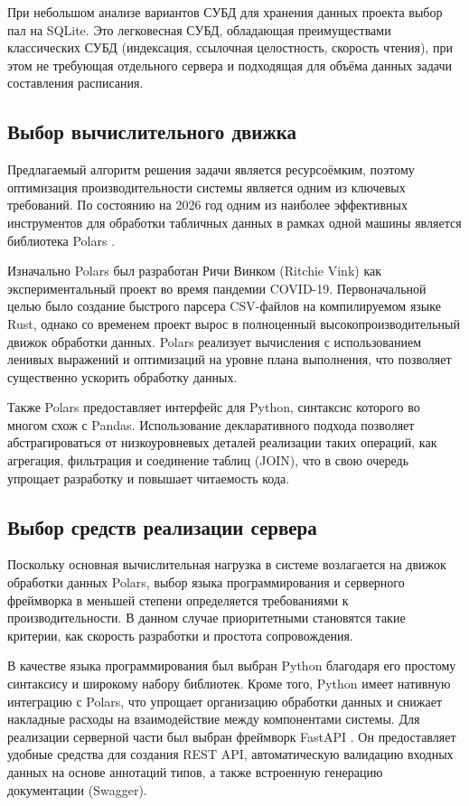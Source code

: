 При небольшом анализе вариантов СУБД для хранения данных проекта выбор пал на SQLite. Это легковесная СУБД, обладающая преимуществами классических СУБД (индексация, ссылочная целостность, скорость чтения), при этом не требующая отдельного сервера и подходящая для объёма данных задачи составления расписания.

\subsection{Выбор вычислительного движка}

Предлагаемый алгоритм решения задачи является ресурсоёмким, поэтому оптимизация производительности системы является одним из ключевых требований. По состоянию на 2026 год одним из наиболее эффективных инструментов для обработки табличных данных в рамках одной машины является библиотека Polars \cite{polars:guide}.

Изначально Polars был разработан Ричи Винком (Ritchie Vink) как экспериментальный проект во время пандемии COVID-19. Первоначальной целью было создание быстрого парсера CSV-файлов на компилируемом языке Rust, однако со временем проект вырос в полноценный высокопроизводительный движок обработки данных. Polars реализует вычисления с использованием ленивых выражений и оптимизаций на уровне плана выполнения, что позволяет существенно ускорить обработку данных.

Также Polars предоставляет интерфейс для Python, синтаксис которого во многом схож с Pandas. Использование декларативного подхода позволяет абстрагироваться от низкоуровневых деталей реализации таких операций, как агрегация, фильтрация и соединение таблиц (JOIN), что в свою очередь упрощает разработку и повышает читаемость кода.

\subsection{Выбор средств реализации сервера}

Поскольку основная вычислительная нагрузка в системе возлагается на движок обработки данных Polars, выбор языка программирования и серверного фреймворка в меньшей степени определяется требованиями к производительности. В данном случае приоритетными становятся такие критерии, как скорость разработки и простота сопровождения.

В качестве языка программирования был выбран Python благодаря его простому синтаксису и широкому набору библиотек. Кроме того, Python имеет нативную интеграцию с Polars, что упрощает организацию обработки данных и снижает накладные расходы на взаимодействие между компонентами системы.
Для реализации серверной части был выбран фреймворк FastAPI \cite{fastapi:docs}. Он предоставляет удобные средства для создания REST API, автоматическую валидацию входных данных на основе аннотаций типов, а также встроенную генерацию документации (Swagger).

